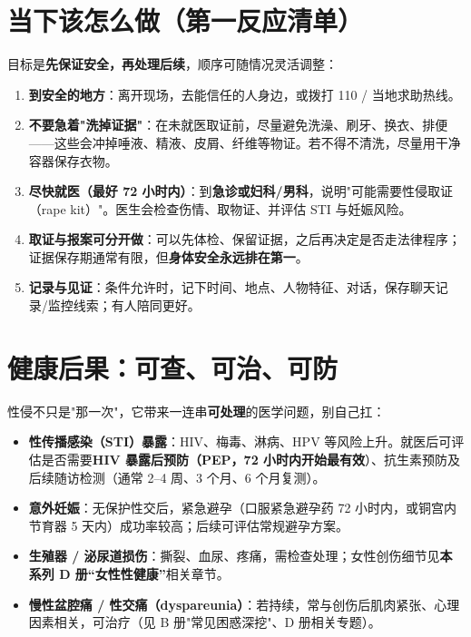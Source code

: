 \section{当下该怎么做（第一反应清单）}
目标是\textbf{先保证安全，再处理后续}，顺序可随情况灵活调整：
\begin{enumerate}
  \item \textbf{到安全的地方}：离开现场，去能信任的人身边，或拨打 110 / 当地求助热线。
  \item \textbf{不要急着"洗掉证据"}：在未就医取证前，尽量避免洗澡、刷牙、换衣、排便——这些会冲掉唾液、精液、皮屑、纤维等物证。若不得不清洗，尽量用干净容器保存衣物。
  \item \textbf{尽快就医（最好 72 小时内）}：到\textbf{急诊或妇科/男科}，说明"可能需要性侵取证（rape kit）"。医生会检查伤情、取物证、并评估 STI 与妊娠风险。
  \item \textbf{取证与报案可分开做}：可以先体检、保留证据，之后再决定是否走法律程序；证据保存期通常有限，但\textbf{身体安全永远排在第一}。
  \item \textbf{记录与见证}：条件允许时，记下时间、地点、人物特征、对话，保存聊天记录/监控线索；有人陪同更好。
\end{enumerate}

\section{健康后果：可查、可治、可防}
性侵不只是"那一次"，它带来一连串\textbf{可处理}的医学问题，别自己扛：
\begin{itemize}
  \item \textbf{性传播感染（STI）暴露}：HIV、梅毒、淋病、HPV 等风险上升。就医后可评估是否需要\textbf{HIV 暴露后预防（PEP，72 小时内开始最有效}）、抗生素预防及后续随访检测（通常 2--4 周、3 个月、6 个月复测）。
  \item \textbf{意外妊娠}：无保护性交后，紧急避孕（口服紧急避孕药 72 小时内，或铜宫内节育器 5 天内）成功率较高；后续可评估常规避孕方案。
  \item \textbf{生殖器 / 泌尿道损伤}：撕裂、血尿、疼痛，需检查处理；女性创伤细节见\textbf{本系列 D 册“女性性健康”}相关章节。
  \item \textbf{慢性盆腔痛 / 性交痛（dyspareunia）}：若持续，常与创伤后肌肉紧张、心理因素相关，可治疗（见 B 册"常见困惑深挖"、D 册相关专题）。
\end{itemize}

